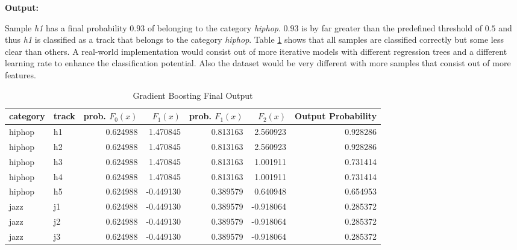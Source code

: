 \textbf{Output:}

Sample \emph{h1} has a final probability \(0.93\) of belonging to the category \emph{hiphop}. \(0.93\) is by far greater than the 
predefined threshold of \(0.5\) and thus \emph{h1} is classified as a track that belongs to the category \emph{hiphop}. Table \ref{tbl:theory_gb_final_output} shows
that all samples are classified correctly but some less clear than others. A real-world implementation would consist 
out of more iterative models with different regression trees and a different learning rate to enhance the 
classification potential. Also the dataset would be very different with more samples that consist out of more features. 

\begin{table}[H]
    \centering
    \begin{tabular}{llrrrrr}
        \toprule
        category & track &  prob. \(F_{0}(x)\) &    \(F_{1}(x)\) &  prob. \(F_{1}(x)\) &       \(F_{2}(x)\) &  Output Probability \\
        \midrule
          hiphop &    h1 &         0.624988 &  1.470845 &         0.813163 &  2.560923 &                          0.928286 \\
          hiphop &    h2 &         0.624988 &  1.470845 &         0.813163 &  2.560923 &                          0.928286 \\
          hiphop &    h3 &         0.624988 &  1.470845 &         0.813163 &  1.001911 &                          0.731414 \\
          hiphop &    h4 &         0.624988 &  1.470845 &         0.813163 &  1.001911 &                          0.731414 \\
          hiphop &    h5 &         0.624988 & -0.449130 &         0.389579 &  0.640948 &                          0.654953 \\
            jazz &    j1 &         0.624988 & -0.449130 &         0.389579 & -0.918064 &                          0.285372 \\
            jazz &    j2 &         0.624988 & -0.449130 &         0.389579 & -0.918064 &                          0.285372 \\
            jazz &    j3 &         0.624988 & -0.449130 &         0.389579 & -0.918064 &                          0.285372 \\
        \bottomrule
        \end{tabular}           
    \caption{Gradient Boosting Final Output}%
    \label{tbl:theory_gb_final_output}%
  \end{table} 

